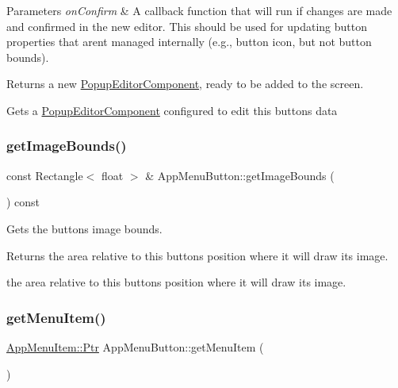 \begin{DoxyParams}{Parameters}
{\em on\+Confirm} & A callback function that will run if changes are made and confirmed in the new editor. This should be used for updating button properties that aren\textquotesingle{}t managed internally (e.\+g., button icon, but not button bounds).\\
\hline
\end{DoxyParams}
\begin{DoxyReturn}{Returns}
a new \mbox{\hyperlink{classPopupEditorComponent}{Popup\+Editor\+Component}}, ready to be added to the screen.
\end{DoxyReturn}
Gets a \mbox{\hyperlink{classPopupEditorComponent}{Popup\+Editor\+Component}} configured to edit this button\textquotesingle{}s data \mbox{\label{classAppMenuButton_a404859940108f1284c0b28f0b66d7567}} 
\subsubsection{\texorpdfstring{get\+Image\+Bounds()}{getImageBounds()}}
{\footnotesize\ttfamily const Rectangle$<$ float $>$ \& App\+Menu\+Button\+::get\+Image\+Bounds (\begin{DoxyParamCaption}{ }\end{DoxyParamCaption}) const\hspace{0.3cm}{\ttfamily [protected]}}

Gets the button\textquotesingle{}s image bounds.

\begin{DoxyReturn}{Returns}
the area relative to this button\textquotesingle{}s position where it will draw its image.

the area relative to this button\textquotesingle{}s position where it will draw its image. 
\end{DoxyReturn}
\mbox{\label{classAppMenuButton_aa4d1780267f97aba5f0cc8359cbea3b2}} 
\subsubsection{\texorpdfstring{get\+Menu\+Item()}{getMenuItem()}}
{\footnotesize\ttfamily \mbox{\hyperlink{classAppMenuItem_ab5f51c5d74f8df62b8862c0cc8126cb7}{App\+Menu\+Item\+::\+Ptr}} App\+Menu\+Button\+::get\+Menu\+Item (\begin{DoxyParamCaption}{ }\end{DoxyParamCaption})}

